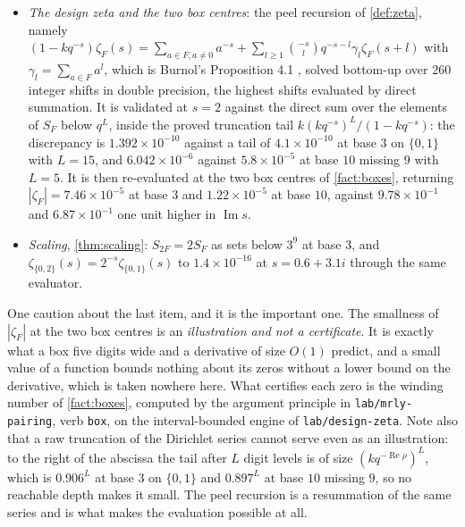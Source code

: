 \documentclass[11pt]{amsart}
\theoremstyle{definition}
\theoremstyle{remark}
\begin{document}
\begin{itemize}
\item \emph{The design zeta and the two box centres}: the peel recursion of \cref{def:zeta}, namely $(1-kq^{-s})\zeta_{F}(s) = \sum_{a \in F, a \ne 0}a^{-s} + \sum_{l \ge 1}\binom{-s}{l}q^{-s-l}\gamma_{l}\zeta_{F}(s+l)$ with $\gamma_{l} = \sum_{a \in F}a^{l}$, which is Burnol's Proposition 4.1 \cite{bur}, solved bottom-up over $260$ integer shifts in double precision, the highest shifts evaluated by direct summation. It is validated at $s = 2$ against the direct sum over the elements of $S_{F}$ below $q^{L}$, inside the proved truncation tail $k(kq^{-s})^{L}/(1-kq^{-s})$: the discrepancy is $1.392\times10^{-10}$ against a tail of $4.1\times10^{-10}$ at base $3$ on $\{0,1\}$ with $L = 15$, and $6.042\times10^{-6}$ against $5.8\times10^{-5}$ at base $10$ missing $9$ with $L = 5$. It is then re-evaluated at the two box centres of \cref{fact:boxes}, returning $|\zeta_{F}| = 7.46\times10^{-5}$ at base $3$ and $1.22\times10^{-5}$ at base $10$, against $9.78\times10^{-1}$ and $6.87\times10^{-1}$ one unit higher in $\operatorname{Im} s$.
\item \emph{Scaling}, \cref{thm:scaling}: $S_{2F} = 2S_{F}$ as sets below $3^{9}$ at base $3$, and $\zeta_{\{0,2\}}(s) = 2^{-s}\zeta_{\{0,1\}}(s)$ to $1.4\times10^{-16}$ at $s = 0.6+3.1i$ through the same evaluator.
\end{itemize}

One caution about the last item, and it is the important one. The smallness of $|\zeta_{F}|$ at the two box centres is an \emph{illustration and not a certificate}. It is exactly what a box five digits wide and a derivative of size $O(1)$ predict, and a small value of a function bounds nothing about its zeros without a lower bound on the derivative, which is taken nowhere here. What certifies each zero is the winding number of \cref{fact:boxes}, computed by the argument principle in \texttt{lab/mrly-pairing}, verb \texttt{box}, on the interval-bounded engine of \texttt{lab/design-zeta}. Note also that a raw truncation of the Dirichlet series cannot serve even as an illustration: to the right of the abscissa the tail after $L$ digit levels is of size $(kq^{-\operatorname{Re}\rho})^{L}$, which is $0.906^{L}$ at base $3$ on $\{0,1\}$ and $0.897^{L}$ at base $10$ missing $9$, so no reachable depth makes it small. The peel recursion is a resummation of the same series and is what makes the evaluation possible at all.
\end{document}
